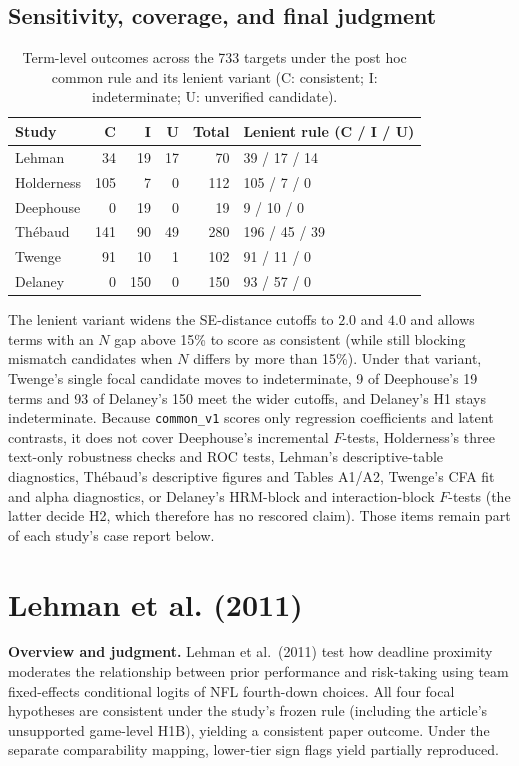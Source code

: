 \documentclass[11pt]{article}
\begin{document}
\subsection{Sensitivity, coverage, and final judgment}
\begin{table}[H]\centering\small
\begin{tabularx}{\linewidth}{@{}lrrrrY@{}}\toprule
Study & C & I & U & Total & Lenient rule (C / I / U)\\\midrule
Lehman & 34 & 19 & 17 & 70 & 39 / 17 / 14\\
Holderness & 105 & 7 & 0 & 112 & 105 / 7 / 0\\
Deephouse & 0 & 19 & 0 & 19 & 9 / 10 / 0\\
Th\'ebaud & 141 & 90 & 49 & 280 & 196 / 45 / 39\\
Twenge & 91 & 10 & 1 & 102 & 91 / 11 / 0\\
Delaney & 0 & 150 & 0 & 150 & 93 / 57 / 0\\\bottomrule
\end{tabularx}\caption{Term-level outcomes across the 733 targets under the post hoc common rule and its lenient variant (C: consistent; I: indeterminate; U: unverified candidate).}\end{table}
The lenient variant widens the SE-distance cutoffs to $2.0$ and $4.0$ and allows terms with an $N$ gap above 15\% to score as consistent (while still blocking mismatch candidates when $N$ differs by more than 15\%). Under that variant, Twenge's single focal candidate moves to indeterminate, 9 of Deephouse's 19 terms and 93 of Delaney's 150 meet the wider cutoffs, and Delaney's H1 stays indeterminate. Because \texttt{common\_v1} scores only regression coefficients and latent contrasts, it does not cover Deephouse's incremental $F$-tests, Holderness's three text-only robustness checks and ROC tests, Lehman's descriptive-table diagnostics, Th\'ebaud's descriptive figures and Tables A1/A2, Twenge's CFA fit and alpha diagnostics, or Delaney's HRM-block and interaction-block $F$-tests (the latter decide H2, which therefore has no rescored claim). Those items remain part of each study's case report below.

\clearpage
\section{Lehman et al. (2011)}\label{sec:lehman}
\textbf{Overview and judgment.} Lehman et al.\ (2011) test how deadline proximity moderates the relationship between prior performance and risk-taking using team fixed-effects conditional logits of NFL fourth-down choices. All four focal hypotheses are consistent under the study's frozen rule (including the article's unsupported game-level H1B), yielding a consistent paper outcome. Under the separate comparability mapping, lower-tier sign flags yield partially reproduced.
\end{document}
